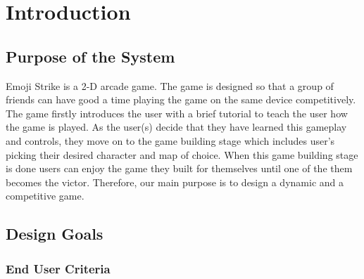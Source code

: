 \documentclass[12pt]{article} %
\begin{document}

\tableofcontents %

\newpage %


\section{Introduction} %


\subsection{Purpose of the System} %


Emoji Strike is a 2-D arcade game. The game is designed so that a group of friends can have good a time playing the game on the same device competitively. The game firstly introduces the user with a brief tutorial to teach the user how the game is played. As the user(s) decide that they have learned this gameplay and controls, they move on to the game building stage which includes user’s picking their desired character and map of choice. When this game building stage is done users can enjoy the game they built for themselves until one of the them becomes the victor. Therefore, our main purpose is to design a dynamic and a competitive game.



\subsection{Design Goals } %



\subsubsection{End User Criteria} %
\end{document}
